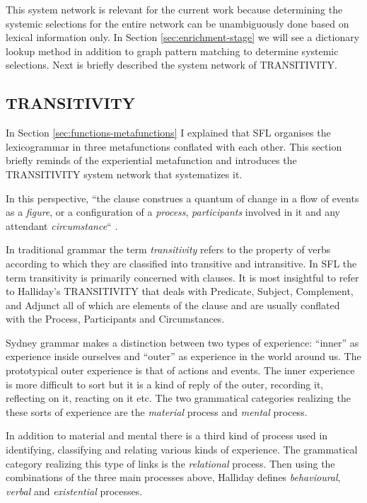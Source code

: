     This system network is relevant for the current work because determining the systemic selections for the entire network can be unambiguously done based on lexical information only. In Section \ref{sec:enrichment-stage} we will see a dictionary lookup method in addition to graph pattern matching to determine systemic selections. Next is briefly described the system network of TRANSITIVITY. 
      
\subsection{TRANSITIVITY}
\label{sec:transitivity}
In Section \ref{sec:functions-metafunctions} I explained that SFL organises the lexicogrammar in three metafunctions conflated with each other. This section briefly reminds of the experiential metafunction and introduces the TRANSITIVITY system network that systematizes it.

In this perspective, ``the clause construes a quantum of change in a flow of events as a \textit{figure}, or a configuration of a \textit{process}, \textit{participants} involved in it and any attendant \textit{circumstance}`` \citep[212]{Halliday2013}. 

In traditional grammar the term \textit{transitivity} refers to the property of verbs according to which they are classified into transitive and intransitive. In SFL the term transitivity is primarily concerned with clauses. It is most insightful to refer to Halliday's TRANSITIVITY \citep{Halliday67-parts1+2,Halliday68-part3,Halliday68} that deals with Predicate, Subject, Complement, and Adjunct all of which are elements of the clause and are usually conflated with the Process, Participants and Circumstances. 

Sydney grammar makes a distinction between two types of experience: ``inner'' as experience inside ourselves and ``outer'' as experience in the world around us. The prototypical outer experience is that of actions and events. The inner experience is more difficult to sort but it is a kind of reply of the outer, recording it, reflecting on it, reacting on it etc. The two grammatical categories realizing the these sorts of experience are the \textit{material} process and \textit{mental} process.

In addition to material and mental there is a third kind of process used in identifying, classifying and relating various kinds of experience. The grammatical category realizing this type of links is the \textit{relational} process. Then using the combinations of the three main processes above, Halliday defines \textit{behavioural}, \textit{verbal} and \textit{existential} processes. 

